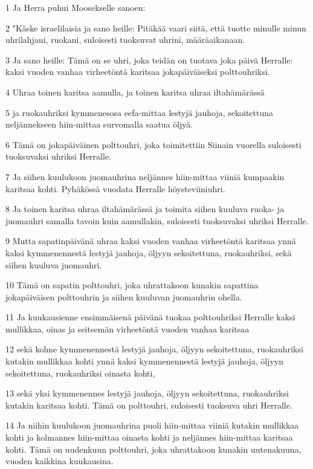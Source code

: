 \par 1 Ja Herra puhui Moosekselle sanoen:
\par 2 "Käske israelilaisia ja sano heille: Pitäkää vaari siitä, että tuotte minulle minun uhrilahjani, ruokani, suloisesti tuoksuvat uhrini, määräaikanaan.
\par 3 Ja sano heille: Tämä on se uhri, joka teidän on tuotava joka päivä Herralle: kaksi vuoden vanhaa virheetöntä karitsaa jokapäiväiseksi polttouhriksi.
\par 4 Uhraa toinen karitsa aamulla, ja toinen karitsa uhraa iltahämärässä
\par 5 ja ruokauhriksi kymmenesosa eefa-mittaa lestyjä jauhoja, sekoitettuna neljännekseen hiin-mittaa survomalla saatua öljyä.
\par 6 Tämä on jokapäiväinen polttouhri, joka toimitettiin Siinain vuorella suloisesti tuoksuvaksi uhriksi Herralle.
\par 7 Ja siihen kuulukoon juomauhrina neljännes hiin-mittaa viiniä kumpaakin karitsaa kohti. Pyhäkössä vuodata Herralle höysteviiniuhri.
\par 8 Ja toinen karitsa uhraa iltahämärässä ja toimita siihen kuuluva ruoka- ja juomauhri samalla tavoin kuin aamullakin, suloisesti tuoksuvaksi uhriksi Herralle.
\par 9 Mutta sapatinpäivänä uhraa kaksi vuoden vanhaa virheetöntä karitsaa ynnä kaksi kymmenennestä lestyjä jauhoja, öljyyn sekoitettuna, ruokauhriksi, sekä siihen kuuluva juomauhri.
\par 10 Tämä on sapatin polttouhri, joka uhrattakoon kunakin sapattina jokapäiväisen polttouhrin ja siihen kuuluvan juomauhrin ohella.
\par 11 Ja kuukausienne ensimmäisenä päivänä tuokaa polttouhriksi Herralle kaksi mullikkaa, oinas ja seitsemän virheetöntä vuoden vanhaa karitsaa
\par 12 sekä kolme kymmenennestä lestyjä jauhoja, öljyyn sekoitettuna, ruokauhriksi kutakin mullikkaa kohti ynnä kaksi kymmenennestä lestyjä jauhoja, öljyyn sekoitettuna, ruokauhriksi oinasta kohti,
\par 13 sekä yksi kymmenennes lestyjä jauhoja, öljyyn sekoitettuna, ruokauhriksi kutakin karitsaa kohti. Tämä on polttouhri, suloisesti tuoksuva uhri Herralle.
\par 14 Ja niihin kuulukoon juomauhrina puoli hiin-mittaa viiniä kutakin mullikkaa kohti ja kolmannes hiin-mittaa oinasta kohti ja neljännes hiin-mittaa karitsaa kohti. Tämä on uudenkuun polttouhri, joka uhrattakoon kunakin uutenakuuna, vuoden kaikkina kuukausina.
